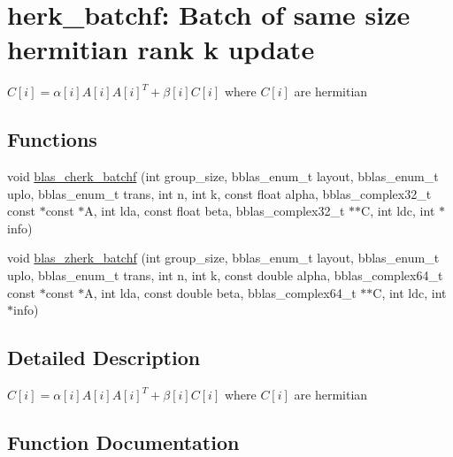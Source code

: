 \hypertarget{group__herk__batchf}{}\section{herk\+\_\+batchf\+: Batch of same size hermitian rank k update}
\label{group__herk__batchf}


$ C[i] = \alpha[i] A[i] A[i]^T + \beta[i] C[i] $ where $ C[i] $ are hermitian  


\subsection*{Functions}
\begin{DoxyCompactItemize}
\item 
void \hyperlink{group__herk__batchf_ga8aad74b7ecbc7e716ee23897487d4f98}{blas\+\_\+cherk\+\_\+batchf} (int group\+\_\+size, bblas\+\_\+enum\+\_\+t layout, bblas\+\_\+enum\+\_\+t uplo, bblas\+\_\+enum\+\_\+t trans, int n, int k, const float alpha, bblas\+\_\+complex32\+\_\+t const $\ast$const $\ast$A, int lda, const float beta, bblas\+\_\+complex32\+\_\+t $\ast$$\ast$C, int ldc, int $\ast$info)
\item 
void \hyperlink{group__herk__batchf_gaa1e04011e03eea04e15c9e8b083a7388}{blas\+\_\+zherk\+\_\+batchf} (int group\+\_\+size, bblas\+\_\+enum\+\_\+t layout, bblas\+\_\+enum\+\_\+t uplo, bblas\+\_\+enum\+\_\+t trans, int n, int k, const double alpha, bblas\+\_\+complex64\+\_\+t const $\ast$const $\ast$A, int lda, const double beta, bblas\+\_\+complex64\+\_\+t $\ast$$\ast$C, int ldc, int $\ast$info)
\end{DoxyCompactItemize}


\subsection{Detailed Description}
$ C[i] = \alpha[i] A[i] A[i]^T + \beta[i] C[i] $ where $ C[i] $ are hermitian 



\subsection{Function Documentation}
